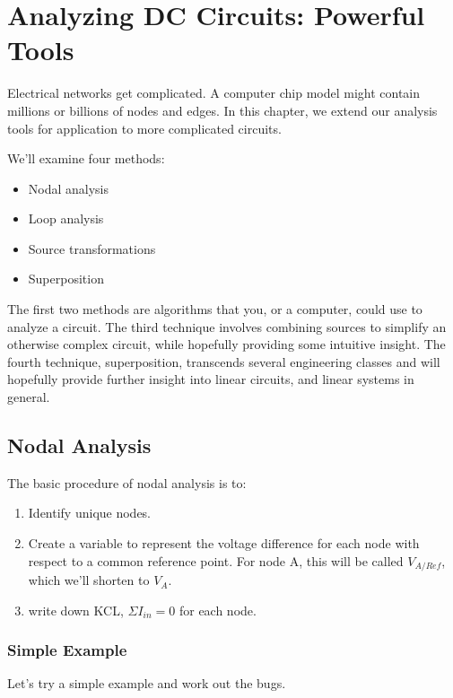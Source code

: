 
\chapter{Analyzing DC Circuits: Powerful Tools}

Electrical networks get complicated. A computer chip model might contain millions or billions of nodes and edges. In this chapter, we extend our analysis tools for application to more complicated circuits.

\par
We'll examine four methods:
\begin{itemize}
\item Nodal analysis
\item Loop analysis
\item Source transformations
\item Superposition
\end{itemize}

The first two methods are algorithms that you, or a computer, could use to analyze a circuit. The third technique involves combining sources to simplify an otherwise complex circuit, while hopefully providing some intuitive insight. The fourth technique, superposition, transcends several engineering classes and will hopefully provide further insight into linear circuits, and linear systems in general.

\par
\section{Nodal Analysis}
The basic procedure of nodal analysis is to:
\begin{enumerate}
\item Identify unique nodes.
\item Create a variable to represent the voltage difference for each node with respect to a common reference point. For node A, this will be called $V_{A/Ref}$, which we'll shorten to $V_A$.
\item write down KCL, $\Sigma I_{in}=0$ for each node. 
\end{enumerate}

\subsection{Simple Example}
Let's try a simple example and work out the bugs.

